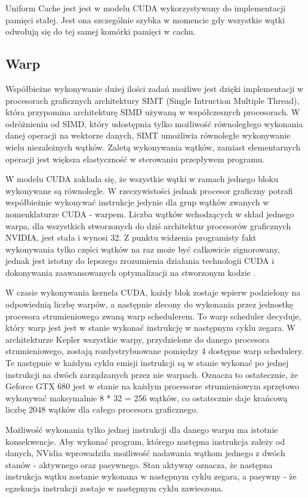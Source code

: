 Uniform Cache jest jest w modelu CUDA wykorzystywany do implementacji pamięci
stałej. Jest ona szczególnie szybka w momencie gdy wszystkie wątki odwołują się
do tej samej komórki pamięci w cachu.

\subsection{Warp}

Współbieżne wykonywanie dużej ilości zadań możliwe jest dzięki implementacji
w procesorach graficznych architektury SIMT (Single Intruction Multiple Thread), która
przypomina architekturę SIMD używaną w współczesnych procesorach. W
odróżnieniu od SIMD, który udostępnia tylko możliwość równoległego wykonania danej
operacji na wektorze danych, SIMT umożliwia równoległe wykonywanie wielu
niezależnych wątków. Zaletą wykonywania wątków, zamiast elementarnych operacji jest większa
elastyczność w sterowaniu przepływem programu.

W modelu CUDA zakłada się, że wszystkie wątki w ramach jednego bloku wykonywane
są równolegle. W rzeczywistości jednak procesor graficzny potrafi współbieżnie
wykonywać instrukcje jedynie dla grup wątków zwanych w nomenklaturze CUDA -
warpem.  Liczba wątków wchodzących w skład jednego warpa, dla wszystkich
stworzonych do dziś architektur procesorów graficznych NVIDIA, jest stała i
wynosi 32. Z punktu widzenia programisty fakt wykonywania tylko części wątków na
raz może być całkowicie zignorowany, jednak jest istotny do lepszego zrozumienia
działania technologii CUDA i dokonywania zaawansowanych optymalizacji na stworzonym
kodzie \cite{kepler}.

W czasie wykonywania kernela CUDA, każdy blok zostaje wpierw podzielony na
odpowiednią liczbę warpów, a następnie zlecony do wykonania przez jednostkę
procesora strumieniowego zwaną warp schedulerem. To warp scheduler decyduje, który warp jest 
jest w stanie wykonać instrukcję w następnym cyklu zegara. W architekturze
Kepler wszystkie warpy, przydzielone do danego procesora strumieniowego,
zostają rozdystrybuowane pomiędzy 4 dostępne warp schedulery. Te następnie w
każdym cyklu emisji instrukcji są w stanie wykonać po jednej instrukcji na
dwóch zarządzanych przez nie warpach. Oznacza to ostatecznie, że Geforce GTX 680
jest w stanie na każdym procesorze strumieniowym sprzętowo wykonywać maksymalnie 8 * 32 =
256 wątków, co ostatecznie daje krańcową liczbę 2048 wątków dla całego procesora
graficznego.

Możliwość wykonania tylko jednej instrukcji dla danego warpu ma istotnie
konsekwencje. Aby wykonać program, którego następna instrukcja
zależy od danych, NVidia wprowadziła możliwość nadawania wątkom jednego z dwóch stanów -
aktywnego oraz pasywnego. Stan aktywny oznacza, że następna instrukcja wątku
zostanie wykonana w następnym cyklu zegara, a pasywny - że egzekucja instrukcji
zostaje w następnym cyklu zawieszona.

